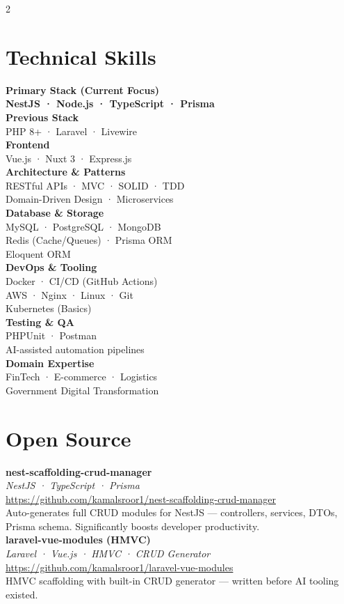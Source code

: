 \documentclass[10pt, a4paper]{article}
\newcommand{\slabel}[1]{{\small\bfseries\color{Dark}#1}\\[1pt]}
\newcommand{\sval}[1]{{\small\color{Mid}#1}\\[7pt]}
\newcommand{\oss}[4]{%
  {\small\bfseries\color{Dark}#1}\\[1pt]%
  {\footnotesize\itshape\color{Light}#2}\\[1pt]%
  \href{#3}{\footnotesize\color{Blue}#3}\\[2pt]%
  {\small\color{Mid}#4}\\[8pt]%
}
\begin{document}
\begin{paracol}{2}
\switchcolumn

\section{Technical Skills}

\slabel{Primary Stack (Current Focus)}
{\small\bfseries\color{Blue}NestJS · Node.js · TypeScript · Prisma}\\[8pt]

\slabel{Previous Stack}
\sval{PHP 8+ · Laravel · Livewire}

\slabel{Frontend}
\sval{Vue.js · Nuxt 3 · Express.js}

\slabel{Architecture \& Patterns}
\sval{RESTful APIs · MVC · SOLID · TDD\\Domain-Driven Design · Microservices}

\slabel{Database \& Storage}
\sval{MySQL · PostgreSQL · MongoDB\\Redis (Cache/Queues) · Prisma ORM\\Eloquent ORM}

\slabel{DevOps \& Tooling}
\sval{Docker · CI/CD (GitHub Actions)\\AWS · Nginx · Linux · Git\\Kubernetes (Basics)}

\slabel{Testing \& QA}
\sval{PHPUnit · Postman\\AI-assisted automation pipelines}

\slabel{Domain Expertise}
\sval{FinTech · E-commerce · Logistics\\Government Digital Transformation}

\section{Open Source}

\oss{nest-scaffolding-crud-manager}%
    {NestJS · TypeScript · Prisma}%
    {https://github.com/kamalsroor1/nest-scaffolding-crud-manager}%
    {Auto-generates full CRUD modules for NestJS — controllers, services, DTOs, Prisma schema. Significantly boosts developer productivity.}

\oss{laravel-vue-modules (HMVC)}%
    {Laravel · Vue.js · HMVC · CRUD Generator}%
    {https://github.com/kamalsroor1/laravel-vue-modules}%
    {HMVC scaffolding with built-in CRUD generator — written before AI tooling existed.}


\end{paracol}
\end{document}

